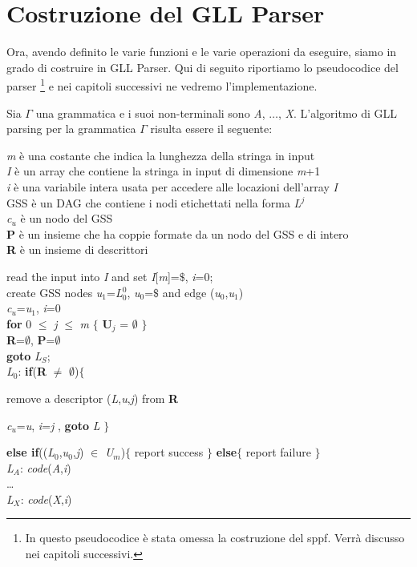 \section{Costruzione del GLL Parser}\label{algoritmoIntero}
Ora, avendo definito le varie funzioni e le varie operazioni da eseguire, siamo in grado di costruire in GLL Parser. Qui di seguito riportiamo lo pseudocodice del parser \footnote{In questo pseudocodice è stata omessa la costruzione del sppf. Verrà discusso nei capitoli successivi.} e nei capitoli successivi ne vedremo l'implementazione.\par 
\vspace{0.2cm}
\noindent Sia $\Gamma$ una grammatica \cite{pubblicazione: scott} e i suoi non-terminali sono \textit{A}, $\dots$, \textit{X}. L'algoritmo di GLL parsing per la grammatica $\Gamma$ risulta essere il seguente:\par
\vspace{0.5cm}
\noindent \textit{m} è una costante che indica la lunghezza della stringa in input\\
\textit{I} è un array che contiene la stringa in input di dimensione \textit{m}+1\\
\textit{i} è una variabile intera usata per accedere alle locazioni dell'array \textit{I}\\
GSS è un DAG che contiene i nodi etichettati nella forma \textit{L$^{j}$}\\
\textit{c}$_u$ è un nodo del GSS\\
\textbf{P} è un insieme che ha coppie formate da un nodo del GSS e di intero\\
\textbf{R} è un insieme di descrittori \par
\vspace{0.5cm}

\noindent read the input into \textit{I} and set \textit{I}[\textit{m}]=$\$$, \textit{i}=0;\\
create GSS nodes \textit{u}$_1$=\textit{L}$_0^{0}$, \textit{u}$_0$=$\$$ and edge (\textit{u}$_0$,\textit{u}$_1$)\\
\textit{c}$_u$=\textit{u}$_1$, \textit{i}=0\\
\textbf{for} 0 $\le$ \textit{j} $\le$ \textit{m} $\{$ \textbf{U$_j$} = $\emptyset$ $\}$\\
\textbf{R}=$\emptyset$, \textbf{P}=$\emptyset$\\
\textbf{goto} \textit{L}$_S$;\\
\textit{L}$_0$: \textbf{if}(\textbf{R} $\ne$ $\emptyset$)$\{$\par
\hspace{2cm} remove a descriptor (\textit{L},\textit{u},\textit{j}) from \textbf{R}\par
\hspace{2cm} \textit{c}$_u$=\textit{u}, \textit{i}=\textit{j} , \textbf{goto} \textit{L} $\}$\par
\hspace{0.1cm} \textbf{else if}((\textit{L}$_0$,\textit{u}$_0$,\textit{j}) $\in$ \textit{U}$_m$)$\{$ report success $\}$ \textbf{else}$\{$ report failure $\}$\\
\textit{L}$_A$: \textit{code}(\textit{A},\textit{i})\\
\dots \\
\textit{L}$_X$: \textit{code}(\textit{X},\textit{i})